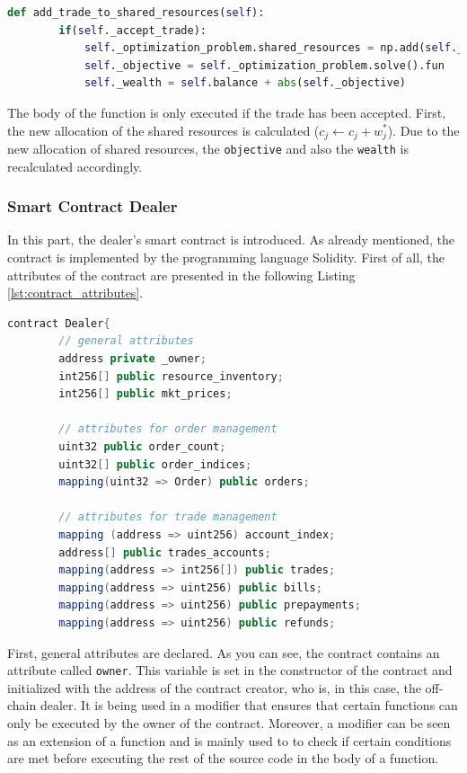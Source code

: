 \begin{lstlisting}[float=htbp, label=lst:add_trade_to_shared_resources, caption=Adding of trade to shared resources, language=Python]
    def add_trade_to_shared_resources(self):
        if(self._accept_trade):
            self._optimization_problem.shared_resources = np.add(self._optimization_problem.shared_resources, self._trade)
            self._objective = self._optimization_problem.solve().fun  
            self._wealth = self.balance + abs(self._objective)
\end{lstlisting}

The body of the function is only executed if the trade has been accepted.
First, the new allocation of the shared resources is calculated ($c_{j} \leftarrow c_{j} + w_{j}^{*}$).
Due to the new allocation of shared resources, the \verb|objective| and also the \verb|wealth| is recalculated accordingly.


\subsubsection{Smart Contract Dealer}
\label{sec:smart_contract_dealer}
In this part, the dealer's smart contract is introduced. 
As already mentioned, the contract is implemented by the programming language Solidity. 
First of all, the attributes of the contract are presented in the following Listing \ref{lst:contract_attributes}.

\begin{lstlisting}[float=htbp, label=lst:contract_attributes, caption=Attributes of Smart Contract, language=Java]
    contract Dealer{
        // general attributes
        address private _owner;
        int256[] public resource_inventory;
        int256[] public mkt_prices;

        // attributes for order management
        uint32 public order_count;
        uint32[] public order_indices;
        mapping(uint32 => Order) public orders;

        // attributes for trade management
        mapping (address => uint256) account_index; 
        address[] public trades_accounts;
        mapping(address => int256[]) public trades;
        mapping(address => uint256) public bills;
        mapping(address => uint256) public prepayments;
        mapping(address => uint256) public refunds;
\end{lstlisting}

First, general attributes are declared. As you can see, the contract contains an attribute called \verb|owner|.
This variable is set in the constructor of the contract and initialized with the address of the contract creator,
who is, in this case, the off-chain dealer.  
It is being used in a modifier that ensures that certain functions can only be executed by the owner of the contract.
Moreover, a modifier can be seen as an extension of a function and is mainly used to 
to check if certain conditions are met before executing the rest of the source code in the body of a function.

